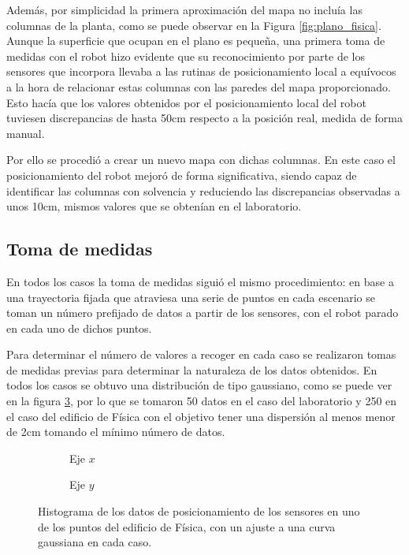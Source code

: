 Además, por simplicidad la primera aproximación del mapa no incluía las columnas de la planta, como se puede observar en la Figura \ref{fig:plano_fisica}.
Aunque la superficie que ocupan en el plano es pequeña, una primera toma de medidas con el robot hizo evidente que su reconocimiento por parte de los sensores que incorpora llevaba a las rutinas de posicionamiento local a equívocos a la hora de relacionar estas columnas con las paredes del mapa proporcionado.
Esto hacía que los valores obtenidos por el posicionamiento local del robot tuviesen discrepancias de hasta 50cm respecto a la posición real, medida de forma manual.

Por ello se procedió a crear un nuevo mapa con dichas columnas.
En este caso el posicionamiento del robot mejoró de forma significativa, siendo capaz de identificar las columnas con solvencia y reduciendo las discrepancias observadas a unos 10cm, mismos valores que se obtenían en el laboratorio.

\subsection{Toma de medidas}

En todos los casos la toma de medidas siguió el mismo procedimiento: en base a una trayectoria fijada que atraviesa una serie de puntos en cada escenario se toman un número prefijado de datos a partir de los sensores, con el robot parado en cada uno de dichos puntos.

Para determinar el número de valores a recoger en cada caso se realizaron tomas de medidas previas para determinar la naturaleza de los datos obtenidos.
En todos los casos se obtuvo una distribución de tipo gaussiano, como se puede ver en la figura \ref{fig:datos_sensor}, por lo que se tomaron 50 datos en el caso del laboratorio y 250 en el caso del edificio de Física con el objetivo tener una dispersión al menos menor de 2cm tomando el mínimo número de datos.

\begin{figure}[H]
  \begin{subfigure}[b]{.5\textwidth}
    \centering
     
    \caption{Eje $x$}
    \label{fig:hist_x}
  \end{subfigure}
  \begin{subfigure}[b]{.5\textwidth}
    \centering
    
    \caption{Eje $y$}
    \label{fig:hist_y}
  \end{subfigure}
  \caption{Histograma de los datos de posicionamiento de los sensores en uno de los puntos del edificio de Física, con un ajuste a una curva gaussiana en cada caso.}
  \label{fig:datos_sensor}
\end{figure}

